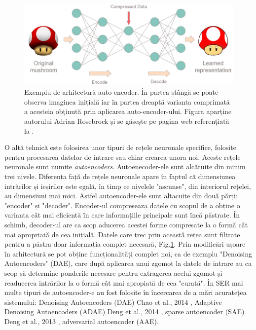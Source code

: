 \documentclass[a4paper,12pt]{book}
\begin{document}
						\begin{figure}[h]
							\centering
							\includegraphics[scale=0.4]{mushroom_encoder}
							\caption{Exemplu de arhitectură auto-encoder. În partea stângă se poate observa imaginea inițială iar în partea dreaptă varianta comprimată a acesteia obținută prin aplicarea auto-encoder-ului. 
							Figura aparține autorului Adrian Rosebrock și se găsește pe pagina web referențiată la \cite{auto}.}
							\label{fig:ae}							
						\end{figure}		
						O altă tehnică este folosirea unor tipuri de rețele neuronale specifice, folosite pentru procesarea datelor de intrare sau chiar crearea unora noi. Aceste rețele neuronale sunt numite \textit{autoencoders}. Autoenecoder-ele sunt alcătuite din minim trei nivele. Diferența față de rețele neuronale apare în faptul că dimensiunea intrărilor și ieșirilor este egală, în timp ce nivelele "ascunse", din interiorul rețelei, au dimensiuni mai mici. Astfel autoencoder-ele sunt altacuite din două părți: "encoder" și "decoder". Encoder-ul compreseaza datele cu scopul de a obține o varianta cât mai eficientă în care informațiile principale sunt încă păstrate. În schimb, decoder-ul are ca scop aducerea acestei forme compresate la o formă cât mai apropriată de cea inițială. Datele care trec prin această rețea sunt filtrate pentru a păstra doar informația complet necesară, Fig.\ref{fig:ae}. Prin modificări ușoare în arhitectură se pot obține funcționalități complet noi, ca de exemplu "Denoising Autoencoders" (DAE), care după aplicarea unui zgomot la datele de intrare au ca scop să determine ponderile necesare pentru extragerea acelui zgomot și readucerea intrărilor la o formă cât mai apropiată de cea "curată". În SER mai multe tipuri de autoencoder-e au fost folosite în încercarea de a mări acuratețea sistemului: Denoising Autoencoders (DAE) Chao et al., 2014 \cite{dae}, Adaptive Denoising Autoencoders (ADAE) Deng et al., 2014 \cite{adae}, sparse autoencoder (SAE) Deng et al., 2013 \cite{sdae}, adversarial autoencoder (AAE). \par
\end{document}
